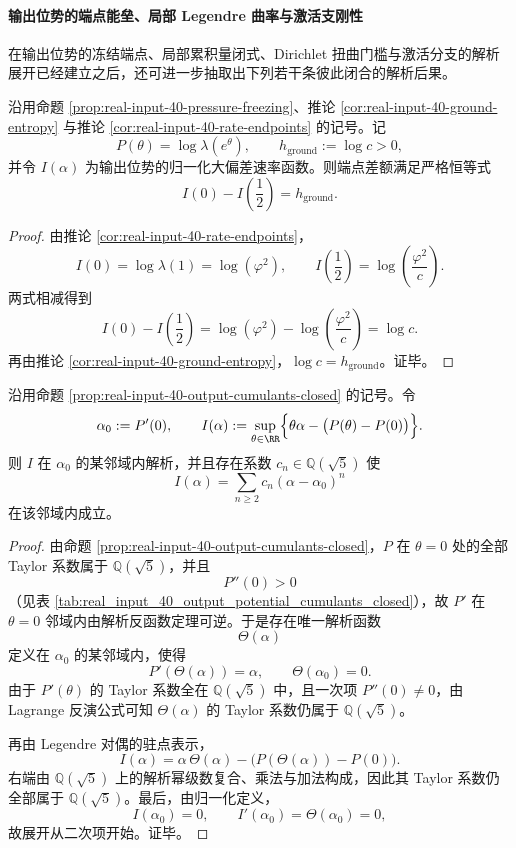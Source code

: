 \paragraph{输出位势的端点能垒、局部 Legendre 曲率与激活支刚性}
在输出位势的冻结端点、局部累积量闭式、Dirichlet 扭曲门槛与激活分支的解析展开已经建立之后，还可进一步抽取出下列若干条彼此闭合的解析后果。

\begin{theorem}[饱和端点的大偏差缺口等于地基熵指数]\label{thm:xi-output-potential-endpoint-gap-ground-state}
沿用命题 \ref{prop:real-input-40-pressure-freezing}、推论 \ref{cor:real-input-40-ground-entropy} 与推论 \ref{cor:real-input-40-rate-endpoints} 的记号。记
\[
P(\theta)=\log\lambda(e^\theta),
\qquad
h_{\mathrm{ground}}:=\log c>0,
\]
并令 \(I(\alpha)\) 为输出位势的归一化大偏差速率函数。则端点差额满足严格恒等式
\[
\boxed{\;
I(0)-I\!\left(\frac12\right)=h_{\mathrm{ground}}.
\;}
\]
\end{theorem}
\begin{proof}
由推论 \ref{cor:real-input-40-rate-endpoints}，
\[
I(0)=\log\lambda(1)=\log(\varphi^2),
\qquad
I\!\left(\frac12\right)=\log\!\left(\frac{\varphi^2}{c}\right).
\]
两式相减得到
\[
I(0)-I\!\left(\frac12\right)
=
\log(\varphi^2)-\log\!\left(\frac{\varphi^2}{c}\right)
=
\log c.
\]
再由推论 \ref{cor:real-input-40-ground-entropy}，\(\log c=h_{\mathrm{ground}}\)。证毕。
\end{proof}

\begin{theorem}\label{thm:xi-output-potential-local-legendre-quadratic-field}
沿用命题 \ref{prop:real-input-40-output-cumulants-closed} 的记号。令
\[
\alpha_0:=P'(0),
\qquad
I(\alpha):=\sup_{\theta\in\RR}\Bigl\{\theta\alpha-\bigl(P(\theta)-P(0)\bigr)\Bigr\}.
\]
则 \(I\) 在 \(\alpha_0\) 的某邻域内解析，并且存在系数 \(c_n\in \mathbb Q(\sqrt5)\) 使
\[
\boxed{\;
I(\alpha)=\sum_{n\ge 2}c_n(\alpha-\alpha_0)^n
\;}
\]
在该邻域内成立。
\end{theorem}
\begin{proof}
由命题 \ref{prop:real-input-40-output-cumulants-closed}，\(P\) 在 \(\theta=0\) 处的全部 Taylor 系数属于 \(\mathbb Q(\sqrt5)\)，并且
\[
P''(0)>0
\]
（见表 \ref{tab:real_input_40_output_potential_cumulants_closed}），故 \(P'\) 在 \(\theta=0\) 邻域内由解析反函数定理可逆。于是存在唯一解析函数
\[
\Theta(\alpha)
\]
定义在 \(\alpha_0\) 的某邻域内，使得
\[
P'(\Theta(\alpha))=\alpha,
\qquad
\Theta(\alpha_0)=0.
\]
由于 \(P'(\theta)\) 的 Taylor 系数全在 \(\mathbb Q(\sqrt5)\) 中，且一次项 \(P''(0)\neq 0\)，由 Lagrange 反演公式可知 \(\Theta(\alpha)\) 的 Taylor 系数仍属于 \(\mathbb Q(\sqrt5)\)。

再由 Legendre 对偶的驻点表示，
\[
I(\alpha)=\alpha\,\Theta(\alpha)-\bigl(P(\Theta(\alpha))-P(0)\bigr).
\]
右端由 \(\mathbb Q(\sqrt5)\) 上的解析幂级数复合、乘法与加法构成，因此其 Taylor 系数仍全部属于 \(\mathbb Q(\sqrt5)\)。最后，由归一化定义，
\[
I(\alpha_0)=0,
\qquad
I'(\alpha_0)=\Theta(\alpha_0)=0,
\]
故展开从二次项开始。证毕。
\end{proof}

